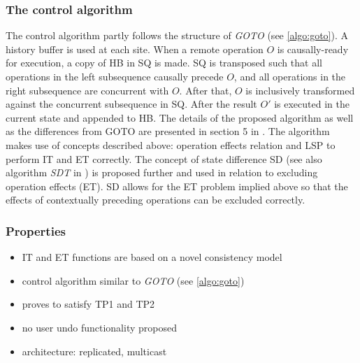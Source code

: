 \subsubsection{The control algorithm}
The control algorithm partly follows the structure of \emph{GOTO} (see \ref{algo:goto}). A history buffer is used at each site. When a remote operation $O$ is causally-ready for execution, a copy of HB in SQ is made. SQ is transposed such that all operations in the left subsequence causally precede $O$, and all operations in the right subsequence are concurrent with $O$. After that, $O$ is inclusively transformed against the concurrent subsequence in SQ. After the result $O'$ is executed in the current state and appended to HB. The details of the proposed algorithm as well as the differences from GOTO are presented in section 5 in \cite{li04}. The algorithm makes use of concepts described above: operation effects relation and LSP to perform IT and ET correctly. The concept of state difference SD (see also algorithm \emph{SDT} in \cite{sdt}) is proposed further and used in relation to excluding operation effects (ET). SD allows for the ET problem implied above so that the effects of contextually preceding operations can be excluded correctly.

\subsubsection{Properties}
\begin{itemize}
 \item IT and ET functions are based on a novel consistency model
 \item control algorithm similar to \emph{GOTO} (see \ref{algo:goto})
 \item proves to satisfy TP1 and TP2
 \item no user undo functionality proposed
 \item architecture: replicated, multicast
\end{itemize}